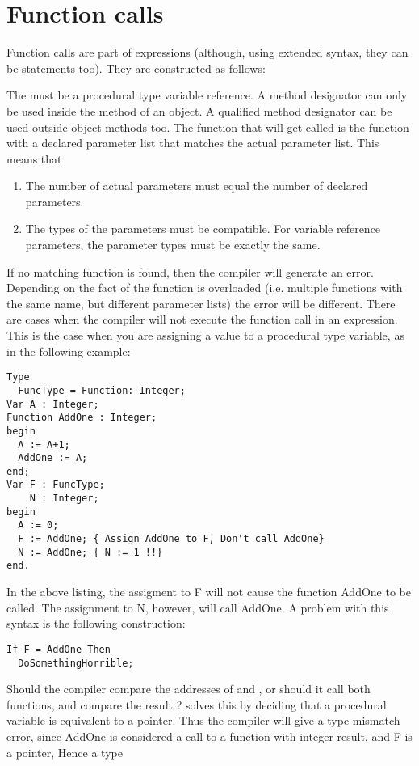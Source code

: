 \documentclass{report}
\begin{document}
\section{Function calls}
Function calls are part of expressions (although, using extended syntax,
they can be statements too). They are constructed as follows:

The  must be a procedural type variable reference.
A method designator can only be used inside the method of an object. A
qualified method designator can be used outside object methods too.
The function that will get called is the function with a declared parameter
list that matches the actual parameter list. This means that
\begin{enumerate}
\item The number of actual parameters must equal the number of declared
parameters.
\item The types of the parameters must be compatible. For variable
reference parameters, the parameter types must be exactly the same.
\end{enumerate}
If no matching function is found, then the compiler will generate an error.
Depending on the fact of the function is overloaded (i.e. multiple functions
with the same name, but different parameter lists) the error will be
different.
There are cases when the compiler will not execute the function call in an
expression. This is the case when you are assigning a value to a procedural
type variable, as in the following example:
\begin{verbatim}
Type
  FuncType = Function: Integer;
Var A : Integer;
Function AddOne : Integer;
begin
  A := A+1;
  AddOne := A;
end;
Var F : FuncType;
    N : Integer;
begin
  A := 0;
  F := AddOne; { Assign AddOne to F, Don't call AddOne}
  N := AddOne; { N := 1 !!}
end.
\end{verbatim}
In the above listing, the assigment to F will not cause the function AddOne
to be called. The assignment to N, however, will call AddOne.
A problem with this syntax is the following construction:
\begin{verbatim}
If F = AddOne Then
  DoSomethingHorrible;
\end{verbatim}
Should the compiler compare the addresses of  and ,
or should it call both functions, and compare the result ? \fpc solves this
by deciding that a procedural variable is equivalent to a pointer. Thus the
compiler will give a type mismatch error, since AddOne is considered a
call to a function with integer result, and F is a pointer, Hence a type
\end{document}

